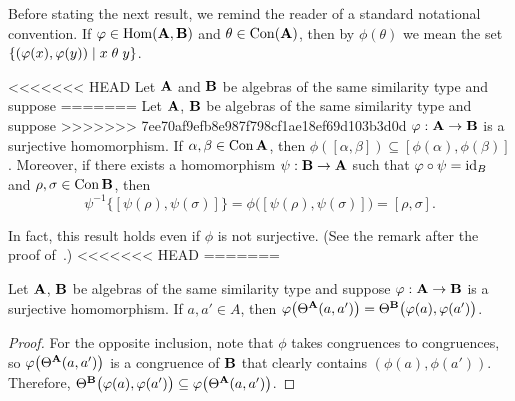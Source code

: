 Before stating the next result, we remind the reader of a 
standard notational convention. 
If $\varphi \in \operatorname{Hom}(\mathbf{A}, \mathbf{B})$ and $\theta \in \operatorname{Con} (\mathbf{A})$, then by
$\phi(\theta)$ we mean the set $\{(\varphi(x), \varphi(y)) \mid x \mathrel{\theta} y \}$.
\begin{lem}
<<<<<<< HEAD
  \label{lem:hom-image-diff-term}
  Let $\mathbf{A}$ and $\mathbf{B}$ be algebras of the same similarity type and suppose
=======
\label{lem:hom-image-diff-term}
  Let $\mathbf{A}$, $\mathbf{B}$ be algebras of the same similarity type and suppose
>>>>>>> 7ee70af9efb8e987f798cf1ae18ef69d103b3d0d
  $\varphi: \mathbf{A} \to \mathbf{B}$ is a surjective homomorphism.  If
  $\alpha, \beta \in \operatorname{Con} \mathbf{A}$, then
  $\phi([\alpha, \beta]) \subseteq [\phi(\alpha), \phi(\beta)]$.
  Moreover, if there exists a homomorphism $\psi: \mathbf{B} \to \mathbf{A}$ such that
  $\varphi \circ \psi = \operatorname{id}_B$ and $\rho, \sigma \in \operatorname{Con} \mathbf{B}$, then
  \[
    \psi^{-1} \{ [ \psi(\rho), \psi(\sigma) ] \} = 
    \phi \bigl( [\psi(\rho), \psi(\sigma)] \bigr)
    = [\rho, \sigma].
  \]
\end{lem}
In fact, this result holds even if $\phi$ is not surjective. (See the remark
after the proof of~\cite[Theorem 2.10]{MR1358491}.)
<<<<<<< HEAD
=======


\begin{lem}
  \label{lem:hom-cong}
  Let $\mathbf{A}$, $\mathbf{B}$ be algebras of the same similarity type and suppose
  $\varphi: \mathbf{A} \to \mathbf{B}$ is a surjective homomorphism.  If $a, a' \in A$, then 
  $\varphi \bigl(\Theta^{\mathbf{A}}(a,a')\bigr) =\Theta^{\mathbf{B}}\bigl(\varphi (a),\varphi(a')\bigr)$.
\end{lem}
\begin{proof}

For the opposite inclusion, note that $\phi$ 
takes congruences to congruences, so $\varphi \bigl(\Theta^{\mathbf{A}}(a,a')\bigr)$ is a congruence
of $\mathbf{B}$ that clearly contains $(\phi (a),\phi(a'))$. Therefore,
$\Theta^{\mathbf{B}}\bigl(\varphi (a),\varphi(a')\bigr) \subseteq \varphi \bigl(\Theta^{\mathbf{A}}(a,a')\bigr)$. 
\end{proof}

